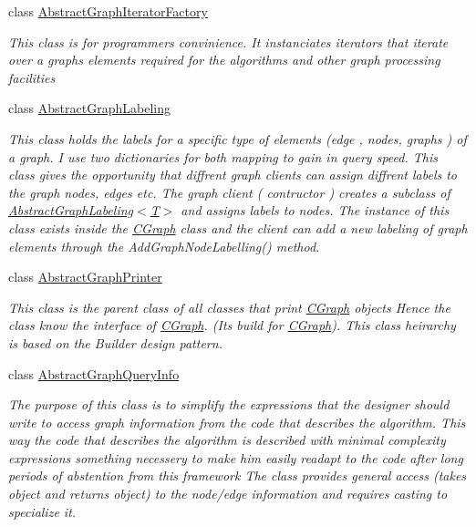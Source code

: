 \begin{DoxyCompactItemize}
class \hyperlink{class_graph_library_1_1_generics_1_1_abstract_graph_iterator_factory}{Abstract\+Graph\+Iterator\+Factory}
\begin{DoxyCompactList}\small\item\em This class is for programmers convinience. It instanciates iterators that iterate over a graph\textquotesingle{}s elements required for the algorithms and other graph processing facilities \end{DoxyCompactList}\item 
class \hyperlink{class_graph_library_1_1_generics_1_1_abstract_graph_labeling}{Abstract\+Graph\+Labeling}
\begin{DoxyCompactList}\small\item\em This class holds the labels for a specific type of elements (edge , nodes, graphs ) of a graph. I use two dictionaries for both mapping to gain in query speed. This class gives the opportunity that diffrent graph clients can assign diffrent labels to the graph nodes, edges etc. The graph client ( contructor ) creates a subclass of \hyperlink{class_graph_library_1_1_generics_1_1_abstract_graph_labeling}{Abstract\+Graph\+Labeling$<$\+T$>$} and assigns labels to nodes. The instance of this class exists inside the \hyperlink{class_graph_library_1_1_c_graph}{C\+Graph} class and the client can add a new labeling of graph elements through the Add\+Graph\+Node\+Labelling() method. \end{DoxyCompactList}\item 
class \hyperlink{class_graph_library_1_1_generics_1_1_abstract_graph_printer}{Abstract\+Graph\+Printer}
\begin{DoxyCompactList}\small\item\em This class is the parent class of all classes that print \hyperlink{class_graph_library_1_1_c_graph}{C\+Graph} objects Hence the class know the interface of \hyperlink{class_graph_library_1_1_c_graph}{C\+Graph}. (Its build for \hyperlink{class_graph_library_1_1_c_graph}{C\+Graph}). This class heirarchy is based on the Builder design pattern. \end{DoxyCompactList}\item 
class \hyperlink{class_graph_library_1_1_generics_1_1_abstract_graph_query_info}{Abstract\+Graph\+Query\+Info}
\begin{DoxyCompactList}\small\item\em The purpose of this class is to simplify the expressions that the designer should write to access graph information from the code that describes the algorithm. This way the code that describes the algorithm is described with minimal complexity expressions something necessery to make him easily readapt to the code after long periods of abstention from this framework The class provides general access (takes object and returns object) to the node/edge information and requires casting to specialize it. \end{DoxyCompactList}\item 

\end{DoxyCompactItemize}
